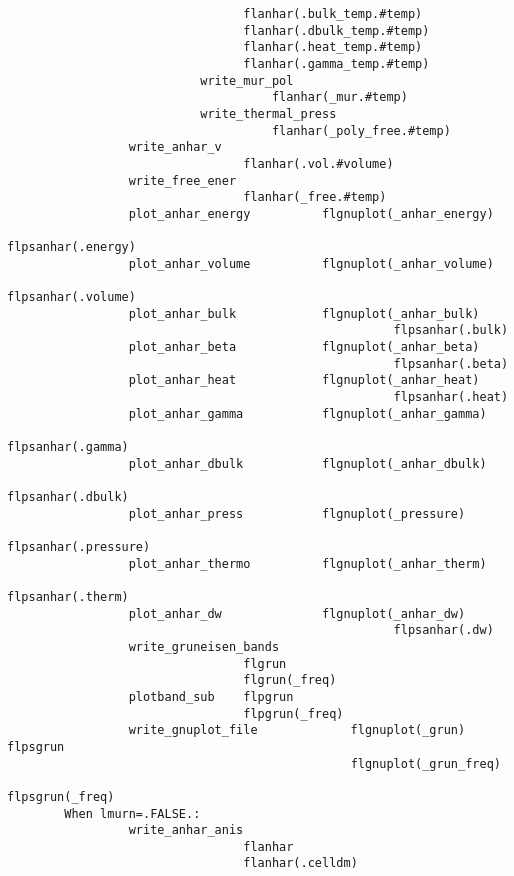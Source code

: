 \documentclass[12pt,a4paper,twoside]{report}
\begin{document}
\begin{footnotesize}
\begin{verbatim}
                                 flanhar(.bulk_temp.#temp)
                                 flanhar(.dbulk_temp.#temp)
                                 flanhar(.heat_temp.#temp)
                                 flanhar(.gamma_temp.#temp)
                           write_mur_pol
                                     flanhar(_mur.#temp)
                           write_thermal_press
                                     flanhar(_poly_free.#temp)
                 write_anhar_v
                                 flanhar(.vol.#volume)
                 write_free_ener
                                 flanhar(_free.#temp)
                 plot_anhar_energy          flgnuplot(_anhar_energy) 
                                                      flpsanhar(.energy)
                 plot_anhar_volume          flgnuplot(_anhar_volume) 
                                                      flpsanhar(.volume)
                 plot_anhar_bulk            flgnuplot(_anhar_bulk) 
                                                      flpsanhar(.bulk)
                 plot_anhar_beta            flgnuplot(_anhar_beta) 
                                                      flpsanhar(.beta)
                 plot_anhar_heat            flgnuplot(_anhar_heat) 
                                                      flpsanhar(.heat)
                 plot_anhar_gamma           flgnuplot(_anhar_gamma) 
                                                      flpsanhar(.gamma)
                 plot_anhar_dbulk           flgnuplot(_anhar_dbulk) 
                                                      flpsanhar(.dbulk)
                 plot_anhar_press           flgnuplot(_pressure)
                                                      flpsanhar(.pressure)
                 plot_anhar_thermo          flgnuplot(_anhar_therm) 
                                                      flpsanhar(.therm)
                 plot_anhar_dw              flgnuplot(_anhar_dw) 
                                                      flpsanhar(.dw)
                 write_gruneisen_bands
                                 flgrun
                                 flgrun(_freq)
                 plotband_sub    flpgrun
                                 flpgrun(_freq)
                 write_gnuplot_file             flgnuplot(_grun)    flpsgrun
                                                flgnuplot(_grun_freq) 
                                                                 flpsgrun(_freq)
        When lmurn=.FALSE.:
                 write_anhar_anis
                                 flanhar
                                 flanhar(.celldm)

\end{verbatim}
\end{footnotesize}
\end{document}
